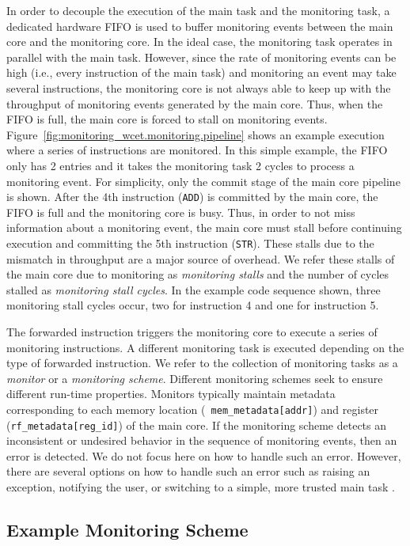In order to decouple the execution of the main task and the monitoring task, a
dedicated hardware FIFO is used to buffer monitoring events between the main
core and the monitoring core.  In the ideal case, the monitoring task operates
in parallel with the main task.  However, since the rate of monitoring events
can be high (i.e., every instruction of the main task) and monitoring an event
may take several instructions, the monitoring core is not always able to keep
up with the throughput of monitoring events generated by the main core.  Thus,
when the FIFO is full, the main core is forced to stall on monitoring events.
Figure~\ref{fig:monitoring_wcet.monitoring.pipeline} shows an example
execution where a series of instructions are monitored. In this simple example,
the FIFO only has 2 entries and it takes the monitoring task 2 cycles to
process a monitoring event. For simplicity, only the commit stage of the main
core pipeline is shown.  After the 4th instruction ({\tt ADD}) is committed by
the main core, the FIFO is full and the monitoring core is busy. Thus, in order
to not miss information about a monitoring event, the main core must stall
before continuing execution and committing the 5th instruction ({\tt STR}).
These stalls due to the mismatch in throughput are a major source of overhead.
We refer these stalls of the main core due to monitoring as \emph{monitoring
stalls} and the number of cycles stalled as \emph{monitoring stall cycles}. In
the example code sequence shown, three monitoring stall cycles occur, two for
instruction 4 and one for instruction 5.

The forwarded instruction triggers the monitoring core to execute a series of
monitoring instructions.  A different monitoring task is executed depending on
the type of forwarded instruction. We refer to the collection of monitoring
tasks as a \emph{monitor} or a \emph{monitoring scheme}. Different monitoring
schemes seek to ensure different run-time properties.  Monitors typically
maintain metadata corresponding to each memory location ({\tt
mem\_metadata[addr]}) and register ({\tt rf\_metadata[reg\_id]}) of the main
core.  If the monitoring scheme detects an inconsistent or undesired behavior
in the sequence of monitoring events, then an error is detected. We do not
focus here on how to handle such an error. However, there are several options
on how to handle such an error such as raising an exception, notifying the
user, or switching to a simple, more trusted main task \cite{sha-simplex-sw01}.

\subsection{Example Monitoring Scheme}

